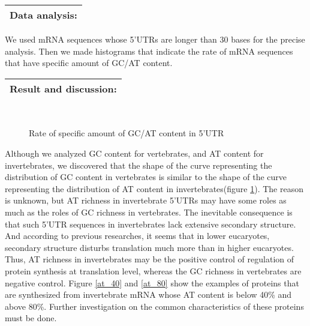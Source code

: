 \vspace{2ex}
\noindent
\begin{tabular}{|l|}
\hline
 Data analysis:\\
\hline
\end{tabular}

We used mRNA sequences whose 5'UTRs are longer than 30 bases for the 
precise analysis. Then we made histograms that indicate the rate of
mRNA sequences that have specific amount of GC/AT content.

\vspace{2ex}
\noindent
\begin{tabular}{|l|}
\hline
 Result and discussion:\\
\hline
\end{tabular}

\begin{figure}
\begin{center}
\\
\end{center}
\caption{Rate of specific amount of GC/AT content in 5'UTR}
\label{gc_at} 
\end{figure}

Although we analyzed GC content for vertebrates, and AT content for
invertebrates, we discovered that the shape of the curve representing
the distribution 
of GC content in vertebrates is similar to the shape of the curve
representing the distribution of AT content in invertebrates(figure
\ref{gc_at}). 
The reason is unknown, but AT richness in invertebrate 5'UTRs may have
some roles as much as the roles of GC richness in vertebrates.
The inevitable consequence is that such 5'UTR sequences in
invertebrates lack extensive
secondary structure. And according to previous researches, it seems
that in lower eucaryotes, secondary 
structure disturbs translation much more than in higher eucaryotes.
Thus, AT richness in invertebrates may be the positive control of
regulation of protein synthesis at translation level, whereas the
GC richness in vertebrates are negative control. 
Figure \ref{at_40} and \ref{at_80} show the examples of proteins
that are synthesized
from invertebrate mRNA whose AT content is below 40\% and above 80\%.  
Further investigation on the common characteristics of these proteins
must be done.

